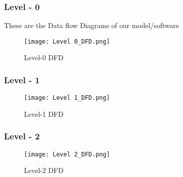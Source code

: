 \documentclass[12pt]{article}
\begin{document}
\subsubsection{Level - 0}
These are the Data flow Diagrams of our model/software
\begin{figure}[H]
    \centering
    \texttt{[image: Level 0\_DFD.png]}
    \caption{Level-0 DFD}
    \label{fig:placeholder}
\end{figure}
\subsubsection{Level - 1}
\begin{figure}[H]
    \centering
    \texttt{[image: Level 1\_DFD.png]}
    \caption{Level-1 DFD}
    \label{fig:placeholder}
\end{figure}
\subsubsection{Level - 2}
\begin{figure}[H]
    \centering
    \texttt{[image: Level 2\_DFD.png]}
    \caption{Level-2 DFD}
    \label{fig:placeholder}
\end{figure}
\end{document}
